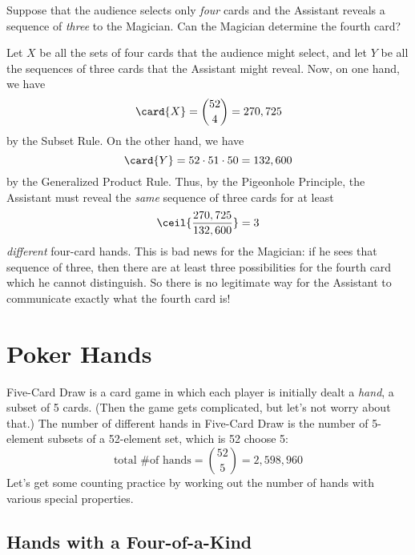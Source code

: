 Suppose that the audience selects only \emph{four} cards and the
Assistant reveals a sequence of \emph{three} to the Magician.  Can
the Magician determine the fourth card?

Let $X$ be all the sets of four cards that the audience might select,
and let $Y$ be all the sequences of three cards that the Assistant
might reveal.  Now, on one hand, we have
\[
\card{X} = \binom{52}{4} = 270,725
\]
by the Subset Rule.  On the other hand, we have
\[
\card{Y} = 52 \cdot 51 \cdot 50 = 132,600
\]
by the Generalized Product Rule.  Thus, by the Pigeonhole Principle, the
Assistant must reveal the \emph{same} sequence of three cards for at
least
\[
\ceil{\frac{270,725}{132,600}} = 3
\]
\emph{different} four-card hands.  This is bad news for the Magician:
if he sees that sequence of three, then there are at least three
possibilities for the fourth card which he cannot distinguish.  So there
is no legitimate way for the Assistant to communicate exactly what the
fourth card is!


\begin{problems}
\classproblems
{}

\end{problems}


\section{Poker Hands}

Five-Card Draw is a card game in which each player is initially dealt
a \emph{hand}, a subset of 5 cards.  (Then the game gets
complicated, but let's not worry about that.)  The number of different
hands in Five-Card Draw is the number of 5-element subsets of a
52-element set, which is 52 choose 5:
%
\[
\text{total \# of hands} = \binom{52}{5} = 2,598,960
\]
%
Let's get some counting practice by working out the number of hands
with various special properties.

\subsection{Hands with a Four-of-a-Kind}

